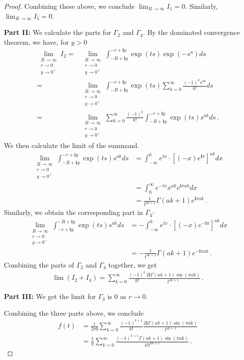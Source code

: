 \documentclass[11pt]{article}
\renewcommand{\i}{\mathbf{i}}
\begin{document}
\begin{proof}
 
Combining these above, we conclude $\lim_{R\to\infty} I_1=0$. Similarly, $\lim_{R\to\infty} I_5=0$.

{\bf Part II:} We calculate the parts for $\Gamma_2$ and $\Gamma_4$. By the dominated convergence theorem, we have, for $y>0$
\begin{align*}
     \lim_{\substack{R\to\infty\\r\to 0 \\ y\to 0^+}} I_2 ={}& \lim_{\substack{R\to\infty\\r\to 0 \\ y\to 0^+}}\int_{-R+\i y}^{-r+\i y} \exp(ts) \exp(-s^a) ds \\
    ={}&  \lim_{\substack{R\to\infty\\r\to 0 \\ y\to 0^+}}\int_{-R+\i y}^{-r+\i y} \exp(ts) \sum_{k=0}^\infty \frac{(-1)^k s^{ak}}{k!}ds \\
    ={}&   \lim_{\substack{R\to\infty\\r\to 0 \\ y\to 0^+}}\sum_{k=0}^\infty \frac{(-1)^k }{k!}  \int_{-R+\i y}^{-r+\i y} \exp(ts) s^{ak} ds \,.
\end{align*}
We then calculate the limit of the summand. 
\begin{align*}
    \lim_{\substack{R\to\infty\\r\to 0 \\ y\to 0^+}} \int_{-R+\i y}^{-r+\i y} \exp(ts) s^{ak} ds&=\int_{-\infty}^0 e^{tx}\cdot [(-x)e^{\i\pi}]^{ak} dx\\
    &=\int_0^{\infty} e^{-tx} x^{ak} e^{\i\pi ak}dx\\
    &=\frac{1}{t^{ak+1}}\Gamma(ak+1)e^{\i\pi ak}\,.
\end{align*}
Similarly, we obtain the corresponding part in $\Gamma_4$:
\begin{align*}
    \lim_{\substack{R\to\infty\\r\to 0 \\ y\to 0^-}} \int_{-r+\i y}^{-R+\i y} \exp(ts) s^{ak} ds&=-\int_{-\infty}^0 e^{tx}\cdot [(-x)e^{-\i\pi}]^{ak} dx\\
    &=-\frac{1}{t^{ak+1}}\Gamma(ak+1)e^{-\i\pi ak}\,.
\end{align*}
Combining the parts of $\Gamma_2$ and $\Gamma_4$ together, we get
\begin{align*}
    \lim(I_2+I_4)=\sum_{k=0}^\infty \frac{(-1)^k }{k!} \frac{2\i\Gamma(ak+1)\sin(\pi ak)}{t^{ak+1}}\,.
\end{align*}

{\bf Part III:} We get the limit for $\Gamma_3$ is $0$ as $r\to 0$.
\bigskip

Combining the three parts above, we conclude
\begin{align*}
    f(t)&=\frac{1}{2\pi\i} \sum_{k=0}^\infty \frac{(-1)^{k+1} }{k!} \frac{2\i\Gamma(ak+1)\sin(\pi ak)}{t^{ak+1}}\\
    &=\frac{1}{\pi}\sum_{k=0}^\infty  \frac{(-1)^{k+1}\Gamma(ak+1)\sin(\pi ak)}{k! t^{ak+1}}\,.
\end{align*}

\end{proof}
\end{document}
